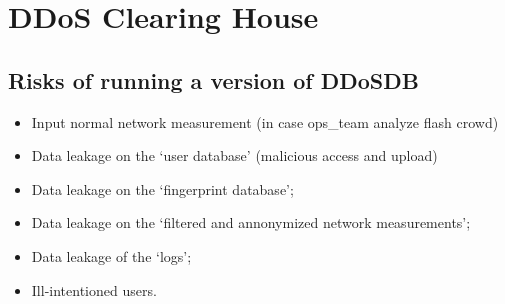\section{DDoS Clearing House}
\label{sec:ddos_clearinghouse}

\subsection{Risks of running a version of DDoSDB}

\begin{itemize}
	\item Input normal network measurement (in case ops_team analyze flash crowd)
	\item Data leakage on the `user database’ (malicious access and upload)
	\item Data leakage on the `fingerprint database’;
	\item Data leakage on the `filtered and annonymized network measurements’;
	\item Data leakage of the `logs';
	\item Ill-intentioned users.
\end{itemize}

